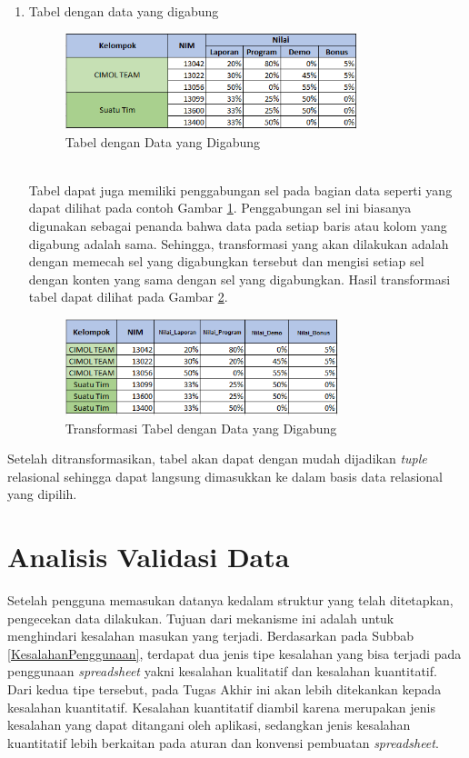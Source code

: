 \begin{enumerate}
	\item Tabel dengan data yang digabung
	\begin{figure}[htbp]
	    \centering
	    \includegraphics[width=0.8\textwidth]{resources/chapter-3-tabletype-4.png}
	    \caption{Tabel dengan Data yang Digabung}
		\label{TabelTipe4}
	\end{figure}\\
	Tabel dapat juga memiliki penggabungan sel pada bagian data seperti yang dapat dilihat pada contoh Gambar \ref{TabelTipe4}. Penggabungan sel ini biasanya digunakan sebagai penanda bahwa data pada setiap baris atau kolom yang digabung adalah sama. Sehingga, transformasi yang akan dilakukan adalah dengan memecah sel yang digabungkan tersebut dan mengisi setiap sel dengan konten yang sama dengan sel yang digabungkan. Hasil transformasi tabel dapat dilihat pada Gambar \ref{TabelTipe4T}.\\
	\begin{figure}[htbp]
	    \centering
	    \includegraphics[width=0.75\textwidth]{resources/chapter-3-tabletype-4-transformed.png}
	    \caption{Transformasi Tabel dengan Data yang Digabung}
		\label{TabelTipe4T}
	\end{figure}
\end{enumerate}
Setelah ditransformasikan, tabel akan dapat dengan mudah dijadikan \textit{tuple} relasional sehingga dapat langsung dimasukkan ke dalam basis data relasional yang dipilih.

\section{Analisis Validasi Data}
Setelah pengguna memasukan datanya kedalam struktur yang telah ditetapkan, pengecekan data dilakukan. Tujuan dari mekanisme ini adalah untuk menghindari kesalahan masukan yang terjadi. Berdasarkan pada Subbab \ref{KesalahanPenggunaan}, terdapat dua jenis tipe kesalahan \citep{Panko1998} yang bisa terjadi pada penggunaan \textit{spreadsheet} yakni kesalahan kualitatif dan kesalahan kuantitatif. Dari kedua tipe tersebut, pada Tugas Akhir ini akan lebih ditekankan kepada kesalahan kuantitatif. Kesalahan kuantitatif diambil karena merupakan jenis kesalahan yang dapat ditangani oleh aplikasi, sedangkan jenis kesalahan kuantitatif lebih berkaitan pada aturan dan konvensi pembuatan \textit{spreadsheet}.

